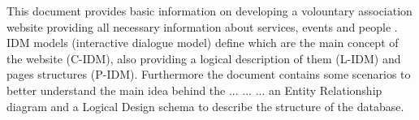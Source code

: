 This document provides basic information on developing a volountary association website providing all necessary information about services, events and people . IDM models (interactive dialogue model) define which are the main concept of the website (C-IDM), also providing a logical description of them (L-IDM) and pages structures (P-IDM). Furthermore the document contains some scenarios to better understand the main idea behind the ... ... ... an Entity Relationship diagram and a Logical Design schema to describe the structure of the database.